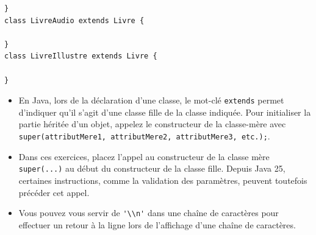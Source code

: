 \begin{Exercice}[20 minutes]
\begin{lstlisting}
}
class LivreAudio extends Livre {
	
}
class LivreIllustre extends Livre {
	
}\end{lstlisting}
\begin{conseil}
    \begin{itemize}
        \item En Java, lors de la déclaration d'une classe, le mot-clé \lstinline{extends} permet d'indiquer qu'il s'agit d'une classe fille de la classe indiquée. 
        Pour initialiser la partie héritée d'un objet, appelez le constructeur de la classe-mère avec \lstinline{super(attributMere1, attributMere2, attributMere3, etc.);}.
        \item Dans ces exercices, placez l'appel au constructeur de la classe mère \lstinline{super(...)} au début du constructeur de la classe fille. Depuis Java 25, certaines instructions, comme la validation des paramètres, peuvent toutefois précéder cet appel.
        \item Vous pouvez vous servir de \lstinline{'\\n'} dans une chaîne de caractères pour effectuer un retour à la ligne lors de l'affichage d'une chaîne de caractères.
    \end{itemize}
\end{conseil}
\begin{solution}
	
\end{solution}
\begin{solution}
    
\end{solution}
\begin{solution}
	
\end{solution}
\end{Exercice}
